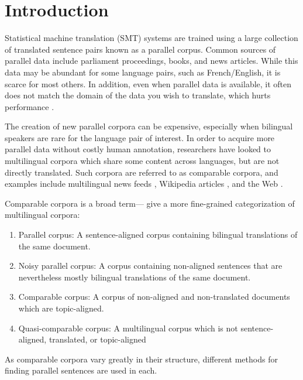 \chapter{Introduction}
\label{chap:intro}

Statistical machine translation (SMT) systems are trained using a large collection of translated
sentence pairs known as a parallel corpus. Common sources of parallel data include
parliament proceedings, books, and news articles.
While this data may be abundant for some language pairs, such as
French/English, it is scarce for most others. In addition, even when parallel
data is available, it often does not match the domain of the data you wish to
translate, which hurts performance \citep{Munteanu05}.

The creation of new parallel corpora can be expensive, especially when bilingual
speakers are rare for the language pair of interest.
In order to acquire more parallel data without costly human annotation,
researchers have looked to multilingual corpora which share some content across languages,
but are not directly translated. Such corpora are referred to as comparable
corpora, and examples include multilingual news feeds \citep{Munteanu05},
Wikipedia articles \citep{Adafre06,Smith10}, and the Web
\citep{Resnik99,Nie99,Chen00}. 

Comparable corpora is a broad term---\citet{Fung04a} give a more
fine-grained categorization of multilingual corpora:
\begin{enumerate}
\item Parallel corpus: A sentence-aligned corpus containing bilingual
translations of the same document.
\item Noisy parallel corpus: A corpus containing non-aligned sentences that are
nevertheless mostly bilingual translations of the same document.
\item Comparable corpus: A corpus of non-aligned and non-translated documents
which are topic-aligned.
\item Quasi-comparable corpus: A multilingual corpus which is not
sentence-aligned, translated, or topic-aligned
\end{enumerate}
As comparable corpora vary greatly in their structure, different methods for finding
parallel sentences are used in each.

